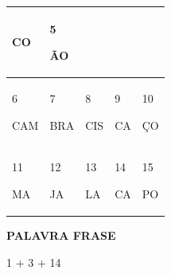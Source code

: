 {{\begin{longtable}[]{@{}lllll@{}}
\begin{minipage}[b]{0.19\columnwidth}
CO\strut
\end{minipage} & \begin{minipage}[b]{0.19\columnwidth}\raggedright\strut
5

ÃO\strut
\end{minipage}\tabularnewline
\midrule
\endhead
\begin{minipage}[t]{0.19\columnwidth}\raggedright\strut
6

CAM\strut
\end{minipage} & \begin{minipage}[t]{0.19\columnwidth}\raggedright\strut
7

BRA\strut
\end{minipage} & \begin{minipage}[t]{0.19\columnwidth}\raggedright\strut
8

CIS\strut
\end{minipage} & \begin{minipage}[t]{0.19\columnwidth}\raggedright\strut
9

CA\strut
\end{minipage} & \begin{minipage}[t]{0.19\columnwidth}\raggedright\strut
10

ÇO\strut
\end{minipage}\tabularnewline
\begin{minipage}[t]{0.19\columnwidth}\raggedright\strut
11

MA\strut
\end{minipage} & \begin{minipage}[t]{0.19\columnwidth}\raggedright\strut
12

JA\strut
\end{minipage} & \begin{minipage}[t]{0.19\columnwidth}\raggedright\strut
13

LA\strut
\end{minipage} & \begin{minipage}[t]{0.19\columnwidth}\raggedright\strut
14

CA\strut
\end{minipage} & \begin{minipage}[t]{0.19\columnwidth}\raggedright\strut
15

PO\strut
\end{minipage}\tabularnewline
\bottomrule
\end{longtable}

\textbf{PALAVRA FRASE}

1 + 3 + 14

}}
